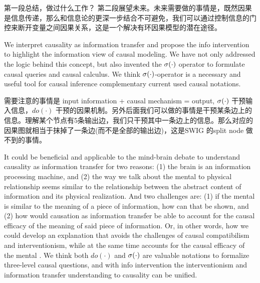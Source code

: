 第一段总结，做过什么工作？
第二段展望未来。未来需要做的事情是，既然因果是信息传递，那么和信息论的更深一步结合不可避免，我们可以通过控制信息的门控来断开变量之间因果关系，这是一个解决有环因果模型的潜在途径。



We interpret causality as information transfer and propose the info intervention to highlight the information view of causal modeling. We have not only addressed the logic behind this concept, but also invented the $\mathrm{\sigma}(\cdot)$ operator to formulate causal queries and causal calculus. We think $\mathrm{\sigma}(\cdot)$-operator is a necessary and useful tool for causal inference complementary current used causal notations.

需要注意的事情是 input information + causal mechanism = output, $\mathrm{\sigma}(\cdot)$ 干预输入信息，$do(\cdot)$ 干预的因果机制。另外后面我们可以做的事情是干预某条边上的信息。理解某个节点有5条输出边，我们只干预其中一条边上的信息。那么对应的因果图就相当于抹掉了一条边(而不是全部的输出边)，这是SWIG 的split node 做不到的事情。


It could be beneficial and applicable to the mind-brain debate to understand causality as information transfer for two reasons:  (1) the brain is an information processing machine, and (2) the way we talk about the mental to physical relationship seems similar to the relationship between the abstract content of information and its physical realization. And two challenges are: (1) if the mental is similar to the meaning of a piece of information, how can that be shown, and (2) how would causation as information transfer be able to account for the causal efficacy of the meaning of said piece of information. Or, in other words, how we could develop an explanation that avoids the challenges of causal compatibilism and interventionism, while at the same time accounts for the causal efficacy of the mental \cite{feltz2019free}. We think both $do(\cdot)$ and $\mathrm{\sigma}(\cdot)$ are valuable notations to formalize three-level causal questions, and with info intervention the interventionism and information transfer understanding to causality can be unified.
